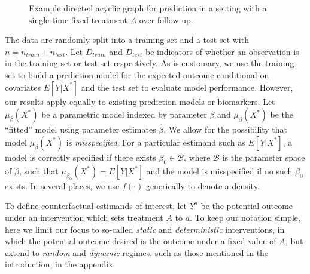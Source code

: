 \begin{figure}[t]
    \centering
    \caption{Example directed acyclic graph for prediction in a setting with a single time fixed treatment $A$ over follow up.}
    \label{fig:dag1}
\end{figure}

The data are randomly split into a training set and a test set with $n = n_{train} + n_{test}$. Let $D_{train}$ and $D_{test}$ be indicators of whether an observation is in the training set or test set respectively. As is customary, we use the training set to build a prediction model for the expected outcome conditional on covariates $E[Y| X^*]$ and the test set to evaluate model performance. However, our results apply equally to existing prediction models or biomarkers. Let $\mu_{\beta}(X^*)$ be a parametric model indexed by parameter $\beta$ and $\mu_{\widehat{\beta}}(X^*)$ be the ``fitted'' model using parameter estimates $\widehat{\beta}$. We allow for the possibility that model $\mu_{\beta}(X^*)$ is \textit{misspecified}. For a particular estimand such as $E[Y | X^*]$, a model is correctly specified if there exists $\beta_0 \in \mathcal{B}$, where $\mathcal{B}$ is the parameter space of $\beta$, such that $\mu_{\beta_0}(X^*) = E[Y | X^*]$ and the model is misspecified if no such $\beta_0$ exists.  In several places, we use $f(\cdot)$ generically to denote a density.

To define counterfactual estimands of interest, let $Y^a$ be the potential outcome under an intervention which sets treatment $A$ to $a$. To keep our notation simple, here we limit our focus to so-called \textit{static} and \textit{deterministic} interventions, in which the potential outcome desired is the outcome under a fixed value of $A$, but extend to \textit{random} and \textit{dynamic} regimes, such as those mentioned in the introduction, in the appendix. 

